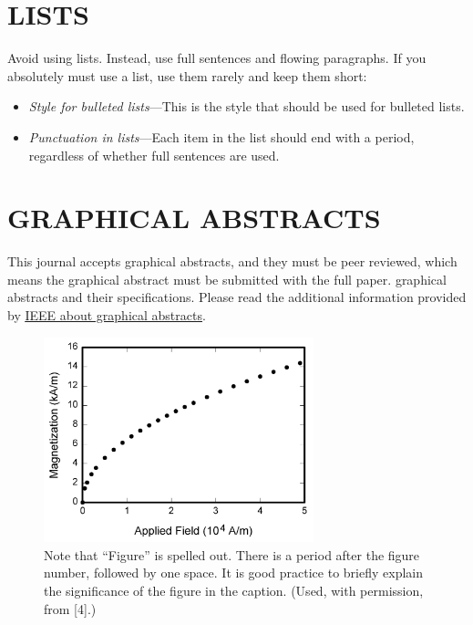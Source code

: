 \documentclass{IEEEcsmag}
\begin{document}
\section{LISTS}

Avoid using lists. Instead, use full sentences and flowing paragraphs. If you absolutely must use a list, use them rarely and keep them short:
\begin{itemize}
\item {\it Style for bulleted lists}---This is the style that should be used for bulleted lists.
	
\item {\it Punctuation in lists}---Each item in the list should end with a period, regardless of whether full sentences are used.
\end{itemize}

\section{GRAPHICAL ABSTRACTS}

This journal accepts graphical abstracts, and they must be peer reviewed, which means the graphical abstract must be submitted with the full paper. graphical abstracts and their specifications. Please read the additional information provided by \href{http://www.ieee.org/publications_standards/publications/graphical_abstract.pdf}{\underline{IEEE about graphical abstracts}}.


\begin{figure}
\centerline{\includegraphics[width=18.5pc]{fig1.png}}
\caption{Note that ``Figure'' is spelled out. There is a period after the figure number, followed by one space. It is good practice to briefly explain the significance of the figure in the caption. (Used, with permission, from [4].)}
\end{figure}
\end{document}
